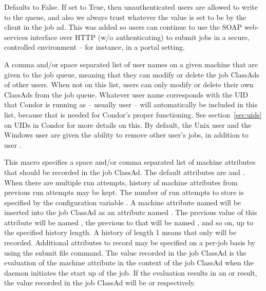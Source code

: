 \begin{description}
\label{param:QueueAllUsersTrusted}
\item[\Macro{QUEUE\_ALL\_USERS\_TRUSTED}]
  Defaults to False. If set to True, then unauthenticated users are allowed
  to write to the queue, and also we always trust whatever the 
  value is set to be by the client in the job ad. This was added so users
  can continue to use the SOAP web-services interface over HTTP (w/o
  authenticating) to submit jobs in a secure, controlled environment -- for
  instance, in a portal setting.
     
\label{param:QueueSuperUsers}
\item[\Macro{QUEUE\_SUPER\_USERS}]
  A comma and/or space separated list of user names on a given machine that
  are given  to the job queue, meaning that they can
  modify or delete the job ClassAds of other users.  When not on this list,
  users can only modify or delete their own ClassAds from the job queue.
  Whatever user name corresponds with the UID that Condor is running as --
  usually user  --
  will automatically be included in this list,
  because that is needed for Condor's proper functioning.
  See section~\ref{sec:uids} on UIDs in Condor for more details on this.
  By default, the Unix user  and the Windows user 
   are given the ability to remove other user's jobs,
  in addition to user .

\label{param:SystemJobMachineAttrs}
\item[\Macro{SYSTEM\_JOB\_MACHINE\_ATTRS}]
  This macro specifies a space and/or comma separated list of
  machine attributes that should be recorded in the job ClassAd.  The
  default attributes are  and .  When
  there are multiple run attempts, history of machine attributes from
  previous run attempts may be kept.  The number of run attempts to
  store is specified by the configuration variable
  .  A machine
  attribute named  will be inserted into the job ClassAd as an
  attribute named .  The previous value of this
  attribute will be named , the previous to that
  will be named , and so on, up to the specified
  history length.  A history of length 1 means that only 
  will be recorded.  Additional attributes to record may be specified on
  a per-job basis by using the  submit
  file command.  The value recorded in the job ClassAd is the evaluation of
  the machine attribute in the context of the job ClassAd when 
  the 
  daemon initiates the start up of the job.  If the evaluation results in
  an  or  result, 
  the value recorded in the job ClassAd will be
   or  respectively.


\end{description}

